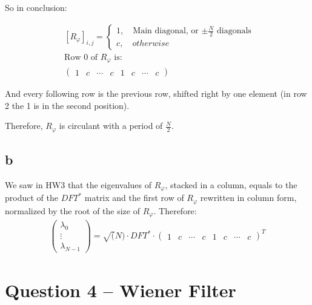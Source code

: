 \documentclass[a4paper]{article}
\begin{document}
So in conclusion:

\begin{align*}
    & [R_\varphi]_{i,j}=
    \begin{cases}
        1 ,\quad \text{Main diagonal, or $\pm\frac{N}{2}$ diagonals } \\
        c , \quad otherwise
    \end{cases} \\
    & \text{Row 0 of $R_\varphi$ is:} \\
    & \begin{pmatrix}
        1 & c & \cdots & c & 1 & c & \cdots & c
    \end{pmatrix}
\end{align*}

And every following row is the previous row, shifted right by one element (in row 2 the 1 is in the second position).

Therefore, $R_\varphi$ is circulant with a period of $\frac{N}{2}$.


\subsection*{b}

We saw in HW3 that the eigenvalues of $R_\varphi$, stacked in a column, equals to the product of the $DFT^*$ matrix and the first row of $R_\varphi$ rewritten in column form, normalized by the root of the size of $R_\varphi$. Therefore: \\

\begin{align*}
    \begin{pmatrix}
        \lambda_0 \\ \vdots \\ \lambda_{N-1}
    \end{pmatrix} = 
    \sqrt(N) \cdot DFT^* \cdot \begin{pmatrix}
        1 & c & \cdots & c & 1 & c & \cdots & c
    \end{pmatrix} ^T
\end{align*}

\newpage
\section*{Question 4 -- Wiener Filter}
\end{document}
